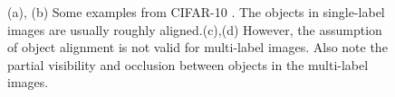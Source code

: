 \begin{figure} 
    \centering
    \label{1a}
    \label{1b}
    \label{1c}
     \label{1d} 
  \caption{(a), (b) Some examples from CIFAR-10 \cite{4}. The objects in     
        single-label images are usually roughly aligned.(c),(d) However, the 
        assumption of object alignment is not valid for multi-label
        images. Also note the partial visibility and occlusion
        between objects in the multi-label images.}
        \vspace{-.5cm}
  \label{fig1} 
\end{figure}




